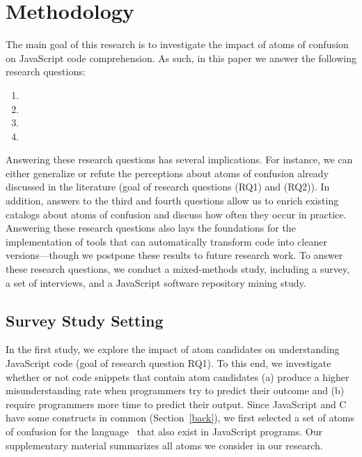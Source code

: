 \section{Methodology}
\label{method}

The main goal of this research is to investigate the impact of atoms of confusion on JavaScript code comprehension. As such, in this paper we answer the following research questions: 

\begin{enumerate}[(RQ1)]
\item \rqa 
\item \rqb
\item \rqc  
\item \rqd
\end{enumerate}

 
Answering these research questions has several implications. For instance, we can either generalize or refute the perceptions about atoms of confusion already discussed in the literature (goal of research questions (RQ1) and (RQ2)). In addition, answers to the third and fourth questions allow us to enrich existing catalogs about atoms of confusion and discuss how often they occur in practice. Answering these research questions also lays the foundations for the implementation of tools that can automatically transform code into cleaner versions---though we postpone these results to future research work. To answer these research questions, we conduct a mixed-methods study, including a survey, a set of interviews, and a JavaScript software repository mining study.  


\subsection{Survey Study Setting}\label{sec:meth:survey}

In the first study, we explore the impact of atom candidates on
understanding JavaScript code (goal of research question RQ1).	
To this end, we investigate whether or not code snippets that
contain atom candidates (a) produce a higher
misunderstanding rate when programmers
try to predict their outcome and (b) require
programmers more time to predict their output.
Since JavaScript and C have some constructs in common (Section~\ref{back}), we first selected a set of atoms of confusion for the \clang language~\cite{DBLP:conf/sigsoft/GopsteinIYDZYC17} that also exist in JavaScript programs. Our supplementary material
summarizes all atoms we consider in our research. 

